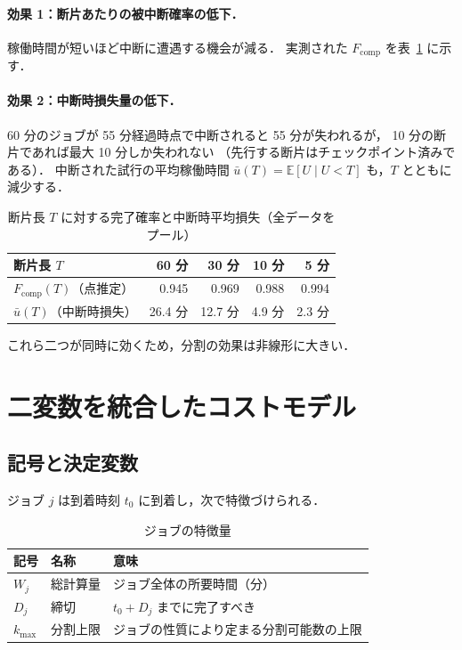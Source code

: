 \documentclass[11pt,a4paper]{ltjsreport}
\newcommand{\Fcomp}{F_{\mathrm{comp}}}
\newcommand{\E}{\mathbb{E}}
\begin{document}
\paragraph{効果 1：断片あたりの被中断確率の低下．}
稼働時間が短いほど中断に遭遇する機会が減る．
実測された $\Fcomp$ を表~\ref{tab:split_effect} に示す．

\paragraph{効果 2：中断時損失量の低下．}
60 分のジョブが 55 分経過時点で中断されると 55 分が失われるが，
10 分の断片であれば最大 10 分しか失われない
（先行する断片はチェックポイント済みである）．
中断された試行の平均稼働時間
$\bar u(T) = \E[U \mid U < T]$ も，$T$ とともに減少する．

\begin{table}[htbp]
\centering
\caption{断片長 $T$ に対する完了確率と中断時平均損失（全データをプール）}
\label{tab:split_effect}
\small
\begin{tabular}{@{}lrrrr@{}}
\toprule
断片長 $T$ & 60 分 & 30 分 & 10 分 & 5 分 \\
\midrule
$\Fcomp(T)$（点推定）   & 0.945 & 0.969 & 0.988 & 0.994 \\
$\bar u(T)$（中断時損失） & 26.4 分 & 12.7 分 & 4.9 分 & 2.3 分 \\
\bottomrule
\end{tabular}
\end{table}

これら二つが同時に効くため，分割の効果は非線形に大きい．

\section{二変数を統合したコストモデル}
\label{sec:model}

\subsection{記号と決定変数}

ジョブ $j$ は到着時刻 $t_0$ に到着し，次で特徴づけられる．

\begin{table}[htbp]
\centering
\caption{ジョブの特徴量}
\label{tab:job}
\small
\begin{tabularx}{\textwidth}{@{}llX@{}}
\toprule
記号 & 名称 & 意味 \\
\midrule
$W_j$      & 総計算量 & ジョブ全体の所要時間（分） \\
$D_j$      & 締切     & $t_0 + D_j$ までに完了すべき \\
$k_{\max}$ & 分割上限 & ジョブの性質により定まる分割可能数の上限 \\
\bottomrule
\end{tabularx}
\end{table}
\end{document}

